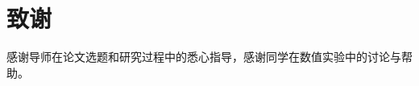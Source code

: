 \documentclass[12pt,a4paper]{ctexart}
\begin{document}
\newpage
\appendix





\newpage
\section*{致谢}

感谢导师在论文选题和研究过程中的悉心指导，感谢同学在数值实验中的讨论与帮助。
\end{document}
